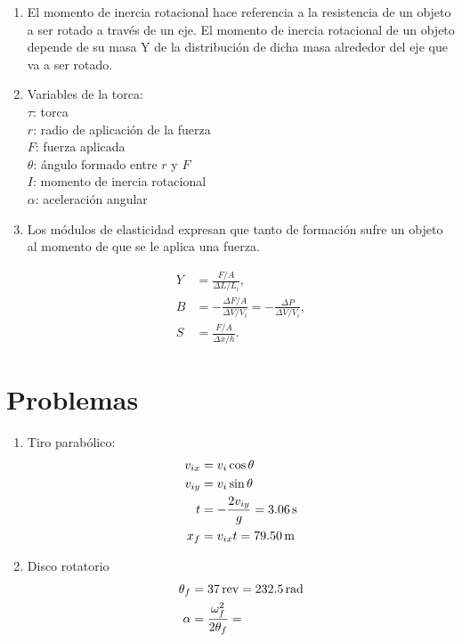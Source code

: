 \documentclass{article}
\begin{document}
\begin{enumerate}
\item El momento de inercia rotacional hace referencia a la resistencia de un
objeto a ser rotado a través de un eje. El momento de inercia rotacional de un
objeto depende de su masa Y de la distribución de dicha masa alrededor del eje
que va a ser rotado.

\item Variables de la torca:\\
$\tau$: torca\\
$r$: radio de aplicación de la fuerza\\
$F$: fuerza aplicada\\
$\theta$: ángulo formado entre $r$ y $F$\\
$I$: momento de inercia rotacional\\
$\alpha$: aceleración angular\\

\item Los módulos de elasticidad expresan que tanto de formación sufre un
objeto al momento de que se le aplica una fuerza.

\begin{align*}
Y &=  \frac{F/A}{\Delta L/L_{i}}, \\
B &= -\frac{\Delta F/A }{\Delta V / V_{i}} 
= -\frac{\Delta P}{\Delta V / V_{i}}, \\
S &=  \frac{F/A}{\Delta x / h}. 
\end{align*}

\end{enumerate}

\section{Problemas} %
\label{sec:problemas}

\begin{enumerate}

\item Tiro parabólico:
\begin{align*}
v_{ix} &= v_{i} \cos \theta \\
v_{iy} &= v_{i}\sin \theta \\
t &= -\frac{2v_{iy}}{g} = 3.06 \text{\,s} \\
x_{f} &= v_{ix}t = 79.50 \text{\,m}
\end{align*}

\item Disco rotatorio
\begin{align*}
\theta_{f} &= 37 \text{\,rev} = 232.5 \text{\,rad} \\
\alpha &= \frac{\omega_{f}^{2}}{2 \theta_{f}} = 
\end{align*}




\end{enumerate}
\end{document}
